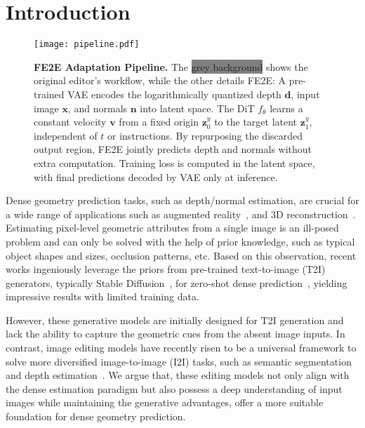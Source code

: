 \documentclass{article} %
\begin{document}
\section{Introduction}
\begin{figure}[!t]  
  \centering
  \texttt{[image: pipeline.pdf]}
  \caption{\textbf{FE2E Adaptation Pipeline.} The \colorbox{grey}{grey background} shows the original editor's workflow, while the other details FE2E:  A pre-trained VAE encodes the logarithmically quantized depth $\mathbf{d}$, input image $\mathbf{x}$, and normals $\mathbf{n}$ into latent space.  The DiT $f_\theta$ learns a constant velocity $\mathbf{v}$ from a fixed origin $\mathbf{z}^y_0$ to the target latent $\mathbf{z}^y_1$, independent of $t$ or instructions.  By repurposing the discarded output region, FE2E jointly predicts depth and normals without extra computation. Training loss is computed in the latent space, with final predictions decoded by VAE only at inference.}
  \label{fig:pipeline}
  \vspace*{-1em}
\end{figure}
Dense geometry prediction tasks, such as depth/normal estimation, are crucial for a wide range of applications such as augmented reality~\citep{ar}, and 3D reconstruction~\citep{3dgs}. 
Estimating pixel-level geometric attributes from a single image is an ill-posed problem and can only be solved with the help of prior knowledge, such as typical object shapes and sizes, occlusion patterns, etc. %
Based on this observation, recent works ingeniously leverage the priors from pre-trained text-to-image (T2I) generators, typically Stable Diffusion~\citep{sd}, for zero-shot dense prediction~\citep{marigold}, yielding impressive results with limited training data.

However, these generative models are initially designed for T2I generation and lack the ability to capture the geometric cues from the absent image inputs. In contrast, image editing models have recently risen to be a universal framework to solve more diversified image-to-image (I2I) tasks, such as semantic segmentation and depth estimation~\citep{qwenimage}. We argue that, these editing models not only align with the dense estimation paradigm but also possess a deep understanding of input images while maintaining the generative advantages, offer a more suitable foundation for dense geometry prediction.
\end{document}
